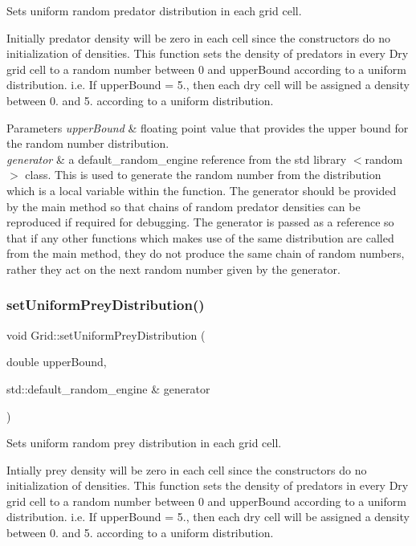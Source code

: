 Sets uniform random predator distribution in each grid cell. 

Initially predator density will be zero in each cell since the constructors do no initialization of densities. This function sets the density of predators in every Dry grid cell to a random number between 0 and upper\+Bound according to a uniform distribution. i.\+e. If upper\+Bound = 5., then each dry cell will be assigned a density between 0. and 5. according to a uniform distribution.


\begin{DoxyParams}{Parameters}
{\em upper\+Bound} & floating point value that provides the upper bound for the random number distribution.\\
\hline
{\em generator} & a default\+\_\+random\+\_\+engine reference from the std library $<$random$>$ class. This is used to generate the random number from the distribution which is a local variable within the function. The generator should be provided by the main method so that chains of random predator densities can be reproduced if required for debugging. The generator is passed as a reference so that if any other functions which makes use of the same distribution are called from the main method, they do not produce the same chain of random numbers, rather they act on the next random number given by the generator. \\
\hline
\end{DoxyParams}
\mbox{\label{class_grid_a2f366ddaaa75475a9597f9a85ab24d59}} 
\subsubsection{\texorpdfstring{set\+Uniform\+Prey\+Distribution()}{setUniformPreyDistribution()}}
{\footnotesize\ttfamily void Grid\+::set\+Uniform\+Prey\+Distribution (\begin{DoxyParamCaption}\item[{double}]{upper\+Bound,  }\item[{std\+::default\+\_\+random\+\_\+engine \&}]{generator }\end{DoxyParamCaption})}

Sets uniform random prey distribution in each grid cell.

Intially prey density will be zero in each cell since the constructors do no initialization of densities. This function sets the density of predators in every Dry grid cell to a random number between 0 and upper\+Bound according to a uniform distribution. i.\+e. If upper\+Bound = 5., then each dry cell will be assigned a density between 0. and 5. according to a uniform distribution.


